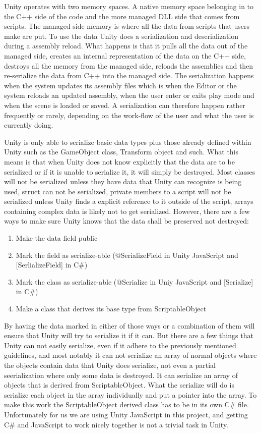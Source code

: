 Unity operates with two memory spaces. A native memory space belonging in to the C++ side of the code and the more managed DLL side that comes from scripts.
The managed side memory is where all the data from scripts that users make are put.
To use the data Unity does a serialization and deserialization during a assembly reload. What happens is that it pulls all the data out of the managed side, creates an internal representation of the data on the C++ side, destroys all the memory from the managed side, reloads the assemblies and then
re-serialize the data from C++ into the managed side.
The serialization happens when the system updates its assembly files which is when the Editor or the system reloads an updated assembly, when the user enter or exits play mode and when the scene is loaded or saved.
A serialization can therefore happen rather frequently or rarely, depending on the work-flow of the user and what the user is currently doing.

Unity is only able to serialize basic data types plus those already defined within Unity such as the GameObject class, Transform object and such.
What this means is that when Unity does not know explicitly that the data are to be serialized or if it is unable to serialize it, it will simply be destroyed. Most classes will not be serialized unless they have data that Unity can recognize is being used, struct can not be serialized, private members to a script will not be serialized unless Unity finds a explicit reference to it outside of the script, arrays containing complex data is likely not to get serialized.
However, there are a few ways to make sure Unity knows that the data shall be preserved not destroyed:

\begin{enumerate}
	\item Make the data field public
	\item Mark the field as serialize-able (@SerializeField in Unity JavaScript and [SerlializeField] in C\#)
	\item Mark the class as serialize-able (@Serialize in Uniy JavaScript and [Serialize] in C\#)
	\item Make a class that derives its base type from ScriptableObject
\end {enumerate}

By having the data marked in either of those ways or a combination of them will ensure that Unity will try to serialize it if it can.
But there are a few things that Unity can not easily serialize, even if it adhere to the previously mentioned guidelines, and most notably it can not serialize an array of normal objects where the objects contain data that Unity does serialize, not even a partial seerialization where only some data is destroyed.
It can serialize an array of objects that is derived from ScriptableObject. What the serialize will do is serialize each object in the
array individually and put a pointer into the array. To make this work the ScriptableObject derived class has to be in its own
C\# file.
Unfortunately for us we are using Unity JavaScript in this project, and getting C\# and JavaScript to work nicely
together is not a trivial task in Unity.

